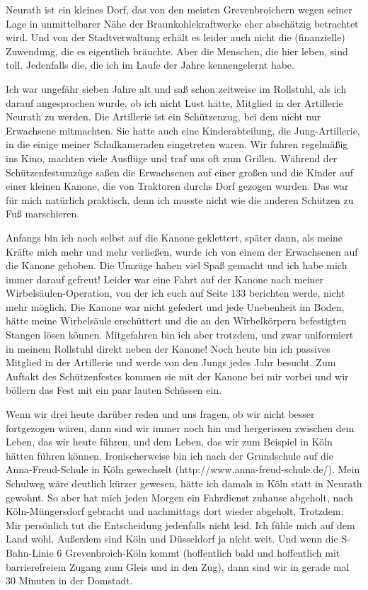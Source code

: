 \documentclass[fontsize=12pt,a4paper,headinclude,DIV=calc,automark]{scrbook}
\begin{document}
Neurath ist ein kleines Dorf, das von den meisten Grevenbroichern wegen seiner Lage in unmittelbarer Nähe der Braunkohlekraftwerke eher abschätzig betrachtet wird. Und von der Stadtverwaltung erhält es leider auch nicht die (finanzielle) Zuwendung, die es eigentlich bräuchte. Aber die Menschen, die hier leben, sind toll. Jedenfalls die, die ich im Laufe der Jahre kennengelernt habe.

Ich war ungefähr sieben Jahre alt und saß schon zeitweise im Rollstuhl, als ich darauf angesprochen wurde, ob ich nicht Lust hätte, Mitglied in der Artillerie Neurath zu werden. Die Artillerie ist ein Schützenzug, bei dem nicht nur Erwachsene mitmachten. Sie hatte auch eine Kinderabteilung, die Jung-Artillerie, in die einige meiner Schulkameraden eingetreten waren. Wir fuhren regelmäßig ins Kino, machten viele Ausflüge und traf uns oft zum Grillen. Während der Schützenfestumzüge saßen die Erwachsenen auf einer großen und die Kinder auf einer kleinen Kanone, die von Traktoren durchs Dorf gezogen wurden. Das war für mich natürlich praktisch, denn ich musste nicht wie die anderen Schützen zu Fuß marschieren.

Anfangs bin ich noch selbst auf die Kanone geklettert, später dann, als meine Kräfte mich mehr und mehr verließen, wurde ich von einem der Erwachsenen auf die Kanone gehoben. Die Umzüge haben viel Spaß gemacht und ich habe mich immer darauf gefreut! Leider war eine Fahrt auf der Kanone nach meiner Wirbelsäulen-Operation, von der ich euch auf Seite 133 berichten werde, nicht mehr möglich. Die Kanone war nicht gefedert und jede Unebenheit im Boden, hätte meine Wirbelsäule erschüttert und die an den Wirbelkörpern befestigten Stangen lösen können. Mitgefahren bin ich aber trotzdem, und zwar uniformiert in meinem Rollstuhl direkt neben der Kanone! Noch heute bin ich passives Mitglied in der Artillerie und werde von den Jungs jedes Jahr besucht. Zum Auftakt des Schützenfestes kommen sie mit der Kanone bei mir vorbei und wir böllern das Fest mit ein paar lauten Schüssen ein.

Wenn wir drei heute darüber reden und uns fragen, ob wir nicht besser fortgezogen wären, dann sind wir immer noch hin und hergerissen zwischen dem Leben, das wir heute führen, und dem Leben, das wir zum Beispiel in Köln hätten führen können. Ironischerweise bin ich nach der Grundschule auf die Anna-Freud-Schule in Köln gewechselt (http://www.anna-freud-schule.de/). Mein Schulweg wäre deutlich kürzer gewesen, hätte ich damals in Köln statt in Neurath gewohnt. So aber hat mich jeden Morgen ein Fahrdienst zuhause abgeholt, nach Köln-Müngersdorf gebracht und nachmittags dort wieder abgeholt. Trotzdem: Mir persönlich tut die Entscheidung jedenfalls nicht leid. Ich fühle mich auf dem Land wohl. Außerdem sind Köln und Düsseldorf ja nicht weit. Und wenn die S-Bahn-Linie 6 Grevenbroich-Köln kommt (hoffentlich bald und hoffentlich mit barrierefreiem Zugang zum Gleis und in den Zug), dann sind wir in gerade mal 30 Minuten in der Domstadt.
\end{document}
